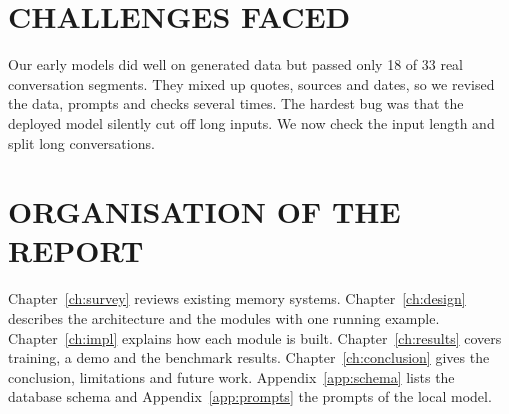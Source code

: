 \section{\uppercase{Challenges Faced}}
Our early models did well on generated data but passed only 18 of 33 real conversation
segments. They mixed up quotes, sources and dates, so we revised the data, prompts and checks
several times. The hardest bug was that the deployed model silently cut off long inputs. We now
check the input length and split long conversations.

\section{\uppercase{Organisation of the Report}}
Chapter~\ref{ch:survey} reviews existing memory systems. Chapter~\ref{ch:design} describes the
architecture and the modules with one running example. Chapter~\ref{ch:impl} explains how each
module is built. Chapter~\ref{ch:results} covers training, a demo and the benchmark results.
Chapter~\ref{ch:conclusion} gives the conclusion, limitations and future work.
Appendix~\ref{app:schema} lists the database schema and Appendix~\ref{app:prompts} the prompts of the local model.
